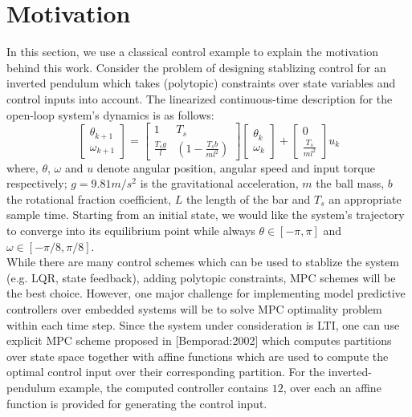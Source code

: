 \section{Motivation}
	In this section, we use a classical control example to explain the motivation behind this work. Consider the problem of designing stablizing control for an inverted pendulum which takes (polytopic) constraints over state variables and control inputs into account. The linearized continuous-time description for the open-loop system's dynamics is as follows:
	\begin{equation}
		\begin{bmatrix}
			 \theta_{k+1}\\
			\omega_{k+1}
		\end{bmatrix}=
		\begin{bmatrix}
			1 & T_s\\
			\frac{T_sg}{l}& (1-\frac{T_sb}{ml^2})		
		\end{bmatrix}
		\begin{bmatrix}
			\theta_k\\
			\omega_k
		\end{bmatrix}+
		\begin{bmatrix}
			0\\
			\frac{T_s}{ml^2}
		\end{bmatrix}u_k
		\label{eq:pendul_ss}
	\end{equation}
	where, $\theta$, $\omega$ and $u$ denote angular position, angular speed and input torque respectively; $g=9.81 m/s^2$ is the gravitational acceleration, $m$ the ball mass, $b$ the rotational fraction coefficient, $L$ the length of the bar and $T_s$ an appropriate sample time. Starting from an initial state, we would like the system's trajectory to converge into its equilibrium point while always $\theta\in[-\pi,\pi]$ and $\omega\in[-\pi/8,\pi/8]$. \\
	While there are many control schemes which can be used to stablize the system (e.g. LQR, state feedback), adding polytopic constraints, MPC schemes will be the best choice. 
	However, one major challenge for implementing model predictive controllers over embedded systems will be to solve MPC optimality problem within each time step. Since the system under consideration is LTI, one can use explicit MPC scheme proposed in [Bemporad:2002] which computes partitions over state space together with affine functions which are used to compute the optimal control input over their corresponding partition. For the inverted-pendulum example, the computed controller contains $12$, over each an affine function is provided for generating the control input.\\
